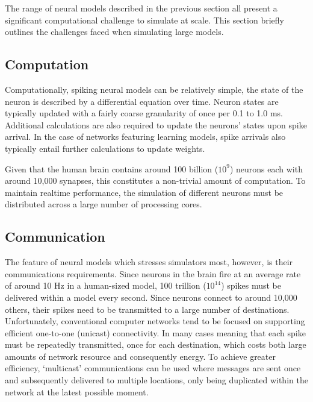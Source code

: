 		The range of neural models described in the previous section all present a
		significant computational challenge to simulate at scale. This section
		briefly outlines the challenges faced when simulating large models.
		
		
		\subsection{Computation}
			
			Computationally, spiking neural models can be relatively simple, the state
			of the neuron is described by a differential equation over time. Neuron
			states are typically updated with a fairly coarse granularity of once per
			0.1 to 1.0 ms. Additional calculations are also required to update the
			neurons' states upon spike arrival. In the case of networks featuring
			learning models, spike arrivals also typically entail further calculations
			to update weights.
			
			Given that the human brain contains around 100 billion ($10^9$) neurons
			each with around 10,000 synapses, this constitutes a non-trivial amount of
			computation. To maintain realtime performance, the simulation of different
			neurons must be distributed across a large number of processing cores.
		
		\subsection{Communication}
			
			
			
			The feature of neural models which stresses simulators most, however, is
			their communications requirements. Since neurons in the brain fire at an
			average rate of around 10 Hz in a human-sized model, 100 trillion
			($10^{14}$) spikes must be delivered within a model every second. Since
			neurons connect to around 10,000 others, their spikes need to be
			transmitted to a large number of destinations. Unfortunately, conventional
			computer networks tend to be focused on supporting efficient one-to-one
			(unicast) connectivity. In many cases meaning that each spike must be
			repeatedly transmitted, once for each destination, which costs both large
			amounts of network resource and consequently energy. To achieve greater
			efficiency, `multicast' communications can be used where messages are sent
			once and subsequently delivered to multiple locations, only being
			duplicated within the network at the latest possible moment.
			
